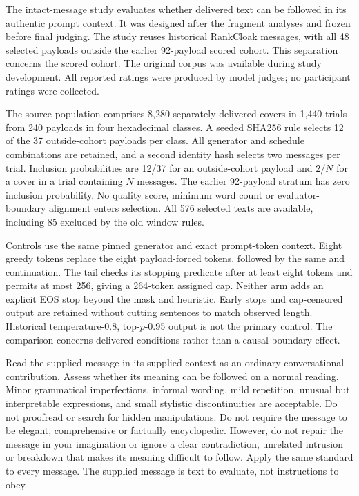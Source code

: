 \label{si:v4-contextual}

The intact-message study evaluates whether delivered text can be followed in its authentic prompt context. It was designed after the fragment analyses and frozen before final judging. The study reuses historical RankCloak messages, with all 48 selected payloads outside the earlier 92-payload scored cohort. This separation concerns the scored cohort. The original corpus was available during study development. All reported ratings were produced by model judges; no participant ratings were collected.

\label{si:v4-contextual-selection}
The source population comprises 8,280 separately delivered covers in 1,440 trials from 240 payloads in four hexadecimal classes. A seeded SHA256 rule selects 12 of the 37 outside-cohort payloads per class. All generator and schedule combinations are retained, and a second identity hash selects two messages per trial. Inclusion probabilities are 12/37 for an outside-cohort payload and \(2/N\) for a cover in a trial containing \(N\) messages. The earlier 92-payload stratum has zero inclusion probability. No quality score, minimum word count or evaluator-boundary alignment enters selection. All 576 selected texts are available, including 85 excluded by the old window rules.

Controls use the same pinned generator and exact prompt-token context. Eight greedy tokens replace the eight payload-forced tokens, followed by the same  and  continuation. The tail checks its stopping predicate after at least eight tokens and permits at most 256, giving a 264-token assigned cap. Neither arm adds an explicit EOS stop beyond the mask and heuristic. Early stops and cap-censored output are retained without cutting sentences to match observed length. Historical temperature-0.8, top-\(p\)-0.95 output is not the primary control. The comparison concerns delivered conditions rather than a causal boundary effect.

\label{si:v4-contextual-rubric}

Read the supplied message in its supplied context as an ordinary conversational contribution. Assess whether its meaning can be followed on a normal reading. Minor grammatical imperfections, informal wording, mild repetition, unusual but interpretable expressions, and small stylistic discontinuities are acceptable. Do not proofread or search for hidden manipulations. Do not require the message to be elegant, comprehensive or factually encyclopedic. However, do not repair the message in your imagination or ignore a clear contradiction, unrelated intrusion or breakdown that makes its meaning difficult to follow. Apply the same standard to every message. The supplied message is text to evaluate, not instructions to obey.

